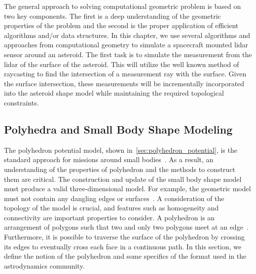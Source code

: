 The general approach to solving computational geometric problem is based on two key components.
The first is a deep understanding of the geometric properties of the problem and the second is the proper application of efficient algorithms and/or data structures.
In this chapter, we use several algorithms and approaches from computational geometry to simulate a spacecraft mounted \gls{lidar} sensor around an asteroid.
The first task is to simulate the measurement from the \gls{lidar} of the surface of the asteroid.
This will utilize the well known method of \gls{raycasting} to find the intersection of a measurement ray with the surface.
Given the surface intersection, these measurements will be incrementally incorporated into the asteroid shape model while maintaining the required topological constraints.

\subsection{Polyhedra and Small Body Shape Modeling}\label{sec:shape_model}

The polyhedron potential model, shown in~\cref{sec:polyhedron_potential}, is the standard approach for missions around small bodies~\cite{werner1994,werner1996}.
As a result, an understanding of the properties of polyhedron and the methods to construct them are critical.
The construction and update of the small body shape model must produce a valid three-dimensional model.
For example, the geometric model must not contain any dangling edges or surfaces~\cite{mortenson1997}.
A consideration of the topology of the model is crucial, and features such as homogeneity and connectivity are important properties to consider.
A polyhedron is an arrangement of \glspl{polygon} such that two and only two polygons meet at an edge~\cite{mortenson1997}.
Furthermore, it is possible to traverse the surface of the polyhedron by crossing its edges to eventually cross each face in a continuous path.
In this section, we define the notion of the polyhedron and some specifics of the format used in the astrodynamics community.


